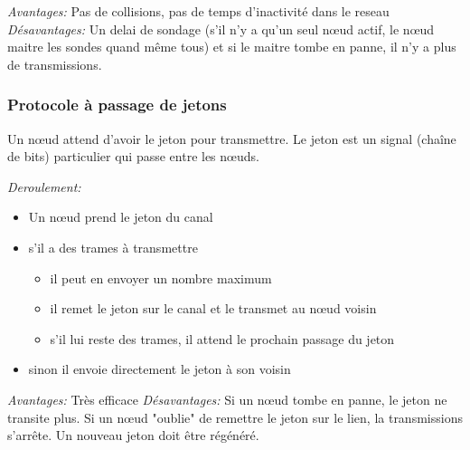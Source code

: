\documentclass[a4paper, 12pt, french]{article}
\begin{document}
	\emph{Avantages:} Pas de collisions, pas de temps d'inactivité dans le reseau
	\emph{Désavantages:} Un delai de sondage (s'il n'y a qu'un seul nœud actif, le nœud maitre les sondes quand même tous) et si le maitre tombe en panne, il n'y a plus de transmissions.

	\subsubsection{Protocole à passage de jetons}

	Un nœud attend d'avoir le jeton pour transmettre. Le jeton est un signal (chaîne de bits) particulier qui passe entre les nœuds.

	\emph{Deroulement:}
	\begin{itemize}
		\item Un nœud prend le jeton du canal
		\item s'il a des trames à transmettre
		\begin{itemize}
			\item il peut en envoyer un nombre maximum
			\item il remet le jeton sur le canal et le transmet au nœud voisin
			\item s'il lui reste des trames, il attend le prochain passage du jeton
		\end{itemize}
		\item sinon il envoie directement le jeton à son voisin
	\end{itemize}

	\emph{Avantages:} Très efficace
	\emph{Désavantages:} Si un nœud tombe en panne, le jeton ne transite plus. Si un nœud "oublie" de remettre le jeton sur le lien, la transmissions s'arrête. Un nouveau jeton doit être régénéré.
\end{document}
